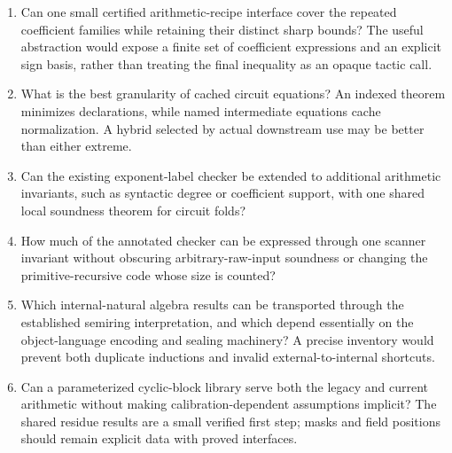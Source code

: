 \documentclass[11pt,letterpaper]{article}
\begin{document}
\begin{enumerate}
\item Can one small certified arithmetic-recipe interface cover the repeated
  coefficient families while retaining their distinct sharp bounds? The useful
  abstraction would expose a finite set of coefficient expressions and an
  explicit sign basis, rather than treating the final inequality as an opaque tactic call.
\item What is the best granularity of cached circuit equations? An indexed
  theorem minimizes declarations, while named intermediate equations cache
  normalization. A hybrid selected by actual downstream use may be better than
  either extreme.
\item Can the existing exponent-label checker be extended to additional
  arithmetic invariants, such as syntactic degree or coefficient support, with
  one shared local soundness theorem for circuit folds?
\item How much of the annotated checker can be expressed through one scanner
  invariant without obscuring arbitrary-raw-input soundness or changing the
  primitive-recursive code whose size is counted?
\item Which internal-natural algebra results can be transported through the
  established semiring interpretation, and which depend essentially on the
  object-language encoding and sealing machinery? A precise inventory would
  prevent both duplicate inductions and invalid external-to-internal shortcuts.
\item Can a parameterized cyclic-block library serve both the legacy and current
  arithmetic without making calibration-dependent assumptions implicit? The
  shared residue results are a small verified first step; masks and field
  positions should remain explicit data with proved interfaces.
\end{enumerate}
\end{document}
